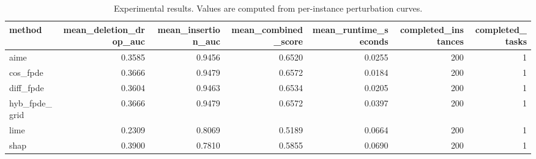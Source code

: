 \begin{table}[t]
\caption{Experimental results. Values are computed from per-instance perturbation curves.}
\label{tab:main_results_computed}
\centering
\begin{tabular}{lrrrrrr}
\toprule
method & mean\_deletion\_drop\_auc & mean\_insertion\_auc & mean\_combined\_score & mean\_runtime\_seconds & completed\_instances & completed\_tasks \\
\midrule
aime & 0.3585 & 0.9456 & 0.6520 & 0.0255 & 200 & 1 \\
cos\_fpde & 0.3666 & 0.9479 & 0.6572 & 0.0184 & 200 & 1 \\
diff\_fpde & 0.3604 & 0.9463 & 0.6534 & 0.0205 & 200 & 1 \\
hyb\_fpde\_grid & 0.3666 & 0.9479 & 0.6572 & 0.0397 & 200 & 1 \\
lime & 0.2309 & 0.8069 & 0.5189 & 0.0664 & 200 & 1 \\
shap & 0.3900 & 0.7810 & 0.5855 & 0.0690 & 200 & 1 \\
\bottomrule
\end{tabular}

\end{table}
